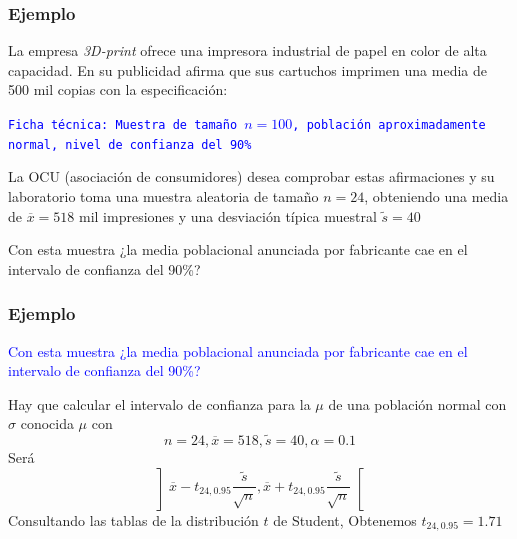 \documentclass[12pt,t]{beamer}
\newcommand{\blue}[1]{\textcolor{blue}{#1}}
\theoremstyle{plain}
\theoremstyle{definition}
\begin{document}
%
%
%
%
%
%
%
%
%




\begin{frame}
\frametitle{Ejemplo}

La empresa \textsl{3D-print} ofrece una impresora industrial de papel en color de alta capacidad. En su publicidad afirma que sus cartuchos imprimen una media de 500 mil copias con la especificación: 
\medskip

\blue{\texttt{Ficha técnica: Muestra de  tamaño  $n=100$,
población aproximadamente normal, nivel de confianza  del 90\%}}
\medskip 

La OCU (asociación de consumidores) desea comprobar estas  afirmaciones y su laboratorio toma una muestra aleatoria de  tamaño  $n=24$, obteniendo una media de $\overline{x}=518$ mil impresiones y una desviación típica muestral 
$\widetilde{s}=40$
\medskip

Con esta muestra ¿la media   poblacional anunciada por fabricante cae en el  intervalo de confianza  del 90\%?
\end{frame}

\begin{frame}[fragile]
\frametitle{Ejemplo}


\blue{Con esta muestra ¿la media   poblacional anunciada por fabricante cae en el  intervalo de confianza  del 90\%?}

Hay que  calcular el intervalo de confianza  para la $\mu$ de una población normal con $\sigma$ conocida $\mu$ con 
$$
n=24, \overline{x}=518, \widetilde{s}=40, \alpha=0.1
$$
Será
$$
\left] 
\overline{x}-t_{24,0.95} \frac{\widetilde{s}}{\sqrt{n}},
\overline{x}+t_{24,0.95} \frac{\widetilde{s}}{\sqrt{n}}\right[
$$
Consultando las tablas de la distribución  $t$ de Student, Obtenemos $t_{24,0.95}=1.71$
\end{frame}
\end{document}
